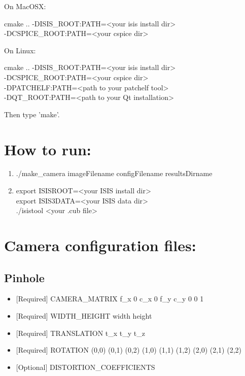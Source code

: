 \documentclass[float=false, crop=false]{standalone}
\begin{document}
\begin{enumerate}
On MacOSX:

cmake .. -DISIS\_ROOT:PATH=<your isis install dir>      \\
         -DCSPICE\_ROOT:PATH=<your cspice dir>

On Linux:

cmake .. -DISIS\_ROOT:PATH=<your isis install dir>      \\
         -DCSPICE\_ROOT:PATH=<your cspice dir>          \\
         -DPATCHELF:PATH=<path to your patchelf tool>    \\
         -DQT\_ROOT:PATH=<path to your Qt installation>

Then type 'make'.

\end{enumerate}

\section{How to run:}
\begin{enumerate}
   \item./make\_camera imageFilename configFilename resultsDirname
   \item export ISISROOT=<your ISIS install dir>\\
export ISIS3DATA=<your ISIS data dir>\\
./isistool <your .cub file>
\end{enumerate}

\section{Camera configuration files:}
\subsection{Pinhole}
\begin{itemize}
    \item {[Required] CAMERA\_MATRIX} f\_x 0 c\_x 0 f\_y c\_y 0 0 1 \\
    \item {[Required] WIDTH\_HEIGHT} width height \\
    \item {[Required] TRANSLATION} t\_x t\_y t\_z \\
    \item {[Required] ROTATION} (0,0) (0,1) (0,2) (1,0) (1,1) (1,2) (2,0) (2,1) (2,2) \\
    \item {[Optional] DISTORTION\_COEFFICIENTS}
\end{itemize}
\end{document}
